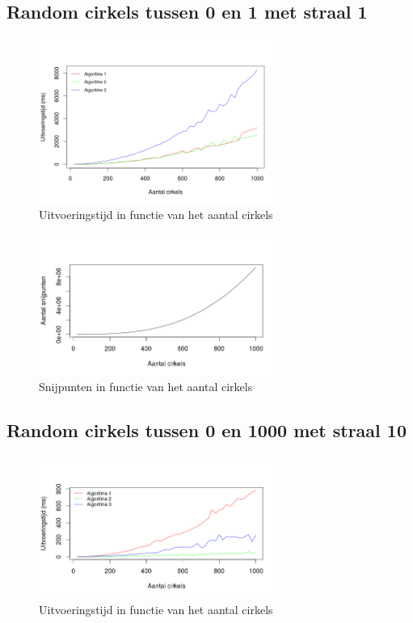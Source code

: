 \documentclass[11pt,a4paper]{article}
\begin{document}
\subsection{Random cirkels tussen 0 en 1 met straal 1}
\begin{figure}[H]
\centering
\includegraphics[width=0.7\textwidth]{uitvoeringstijd_10.png}
\caption*{Uitvoeringstijd in functie van het aantal cirkels}
\end{figure}

\begin{figure}[H]
\centering
\includegraphics[width=0.7\textwidth]{snijpunten_10.png}
\caption*{Snijpunten in functie van het aantal cirkels}
\end{figure}

\subsection{Random cirkels tussen 0 en 1000 met straal 10}
\begin{figure}[H]
\centering
\includegraphics[width=0.7\textwidth]{uitvoeringstijd_100.png}
\caption*{Uitvoeringstijd in functie van het aantal cirkels}
\end{figure}
\end{document}
